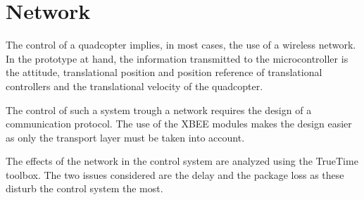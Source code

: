 \chapter{Network} \label{ch:Network}

The control of a quadcopter implies, in most cases, the use of a wireless network. In the prototype at hand, the information transmitted to the microcontroller is the attitude, translational position and position reference of translational controllers and the translational velocity of the quadcopter.

The control of such a system trough a network requires the design of a communication protocol. The use of the XBEE modules makes the design easier as only the transport layer must be taken into account. 

The effects of the network in the control system are analyzed using the TrueTime toolbox. The two issues considered are the delay and the package loss as these disturb the control system the most.
